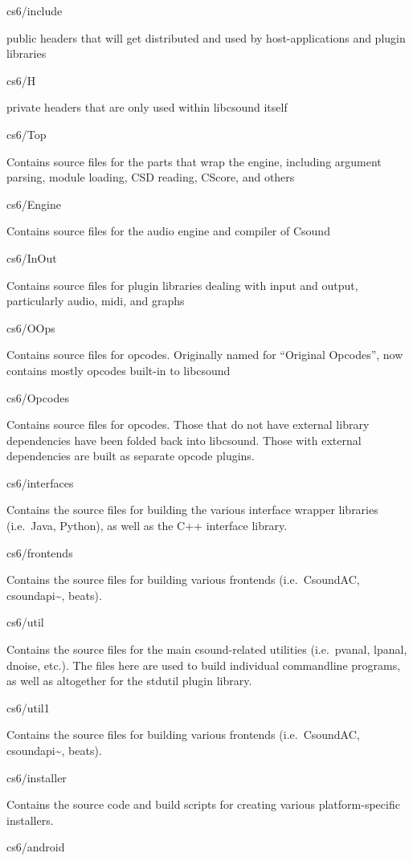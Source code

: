 \documentclass[]{book}
\begin{document}
cs6/include

public headers that will get distributed and used by host-applications
and plugin libraries

cs6/H

private headers that are only used within libcsound itself

cs6/Top

Contains source files for the parts that wrap the engine, including
argument parsing, module loading, CSD reading, CScore, and others

cs6/Engine

Contains source files for the audio engine and compiler of Csound

cs6/InOut

Contains source files for plugin libraries dealing with input and
output, particularly audio, midi, and graphs

cs6/OOps

Contains source files for opcodes. Originally named for ``Original
Opcodes'', now contains mostly opcodes built-in to libcsound

cs6/Opcodes

Contains source files for opcodes. Those that do not have external
library dependencies have been folded back into libcsound. Those with
external dependencies are built as separate opcode plugins.

cs6/interfaces

Contains the source files for building the various interface wrapper
libraries (i.e.~Java, Python), as well as the C++ interface library.

cs6/frontends

Contains the source files for building various frontends (i.e.~CsoundAC,
csoundapi\textasciitilde{}, beats).

cs6/util

Contains the source files for the main csound-related utilities
(i.e.~pvanal, lpanal, dnoise, etc.). The files here are used to build
individual commandline programs, as well as altogether for the stdutil
plugin library.

cs6/util1

Contains the source files for building various frontends (i.e.~CsoundAC,
csoundapi\textasciitilde{}, beats).

cs6/installer

Contains the source code and build scripts for creating various
platform-specific installers.

cs6/android
\end{document}
